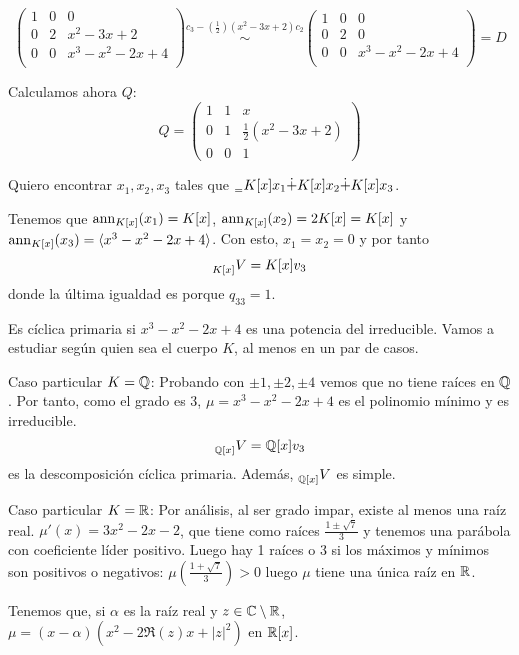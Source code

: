\[
  \begin{pmatrix}
    1   & 0   &  0  \\
    0   & 2    & x^2-3x+2  \\
    0   & 0    & x^3-x^2-2x+4  \\
  \end{pmatrix}
  \overset{c_3-(\frac{1}{2})(x^2-3x+2)c_2}{\sim}
  \begin{pmatrix}
    1   & 0   &  0  \\
    0   & 2    & 0\\
    0   & 0    & x^3-x^2-2x+4  \\
  \end{pmatrix} = D
\]

Calculamos ahora \(Q\):
\[
  Q=
  \begin{pmatrix}
    1 & 1 & x\\
    0 & 1 & \frac{1}{2}(x^2-3x+2)\\
    0 & 0 & 1
  \end{pmatrix}
\]

Quiero encontrar \(x_1, x_2, x_3\) tales que
\(\prescript{}{=}{K}[x]x_1\dot{+}K[x]x_2\dot{+}K[x]x_3\).

Tenemos que \(\operatorname{ann}_{K[x]}(x_1)=K[x]\), \(\operatorname{ann}_{K[x]}(x_2)=2K[x]=K[x]\) y
\(\operatorname{ann}_{K[x]}(x_3)=\langle x^3-x^2-2x+4 \rangle\).
Con esto, \(x_1=x_2=0\) y por tanto
\[
  \prescript{}{K[x]}{V}=K[x]v_3
\]
donde la última igualdad es porque \(q_{33}=1\).

Es cíclica primaria si \( x^3-x^2-2x+4 \) es una potencia del irreducible.
Vamos a estudiar según quien sea el cuerpo \(K\), al menos en un par de
casos.

Caso particular \(K=\mathbb{Q}\): Probando con \(\pm 1, \pm 2, \pm 4\) vemos que
no tiene raíces en \(\mathbb{Q}\). Por tanto, como el grado es 3,
\(\mu= x^3-x^2-2x+4\) es el polinomio mínimo y es irreducible.
\[
  \prescript{}{\mathbb{Q}[x]}{V}=\mathbb{Q}[x]v_3
\]
es la descomposición cíclica primaria. Además, \(\prescript{}{\mathbb{Q}[x]}{V}\)
es simple.

Caso particular \(K=\mathbb{R}\): Por análisis, al ser grado impar, existe al menos
una raíz real. \(\mu'(x)=3x^2-2x-2\), que tiene como raíces
\(\frac{1\pm\sqrt{7}}{3}\) y tenemos una parábola con coeficiente líder
positivo. Luego hay 1 raíces o 3 si los máximos y mínimos son positivos
o negativos: \(\mu(\frac{1+\sqrt{7}}{3})>0\) luego \(\mu\) tiene una única
raíz en \(\mathbb{R}\).

Tenemos que, si \(\alpha\) es la raíz real y \(z\in\mathbb{C}\setminus\mathbb{R}\),
\(\mu=(x-\alpha)(x^2-2\Re(z)x+|z|^2)\) en \(\mathbb{R}[x]\).

